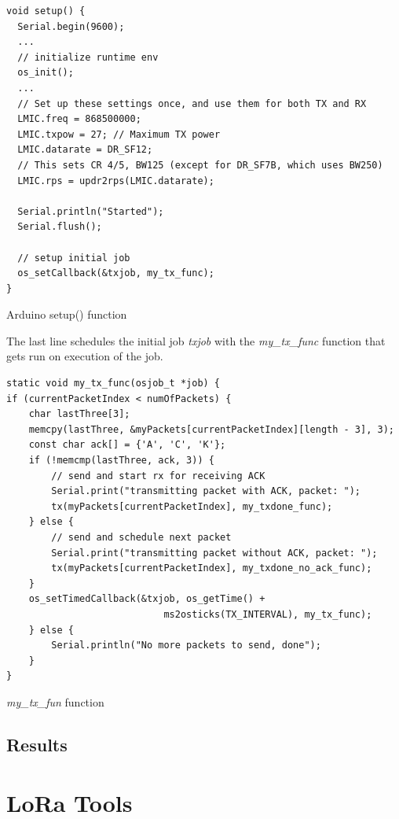 \begin{listing}[H]
    \begin{verbatim}
void setup() {
  Serial.begin(9600);
  ...
  // initialize runtime env
  os_init();
  ...
  // Set up these settings once, and use them for both TX and RX
  LMIC.freq = 868500000;
  LMIC.txpow = 27; // Maximum TX power
  LMIC.datarate = DR_SF12;
  // This sets CR 4/5, BW125 (except for DR_SF7B, which uses BW250)
  LMIC.rps = updr2rps(LMIC.datarate);

  Serial.println("Started");
  Serial.flush();

  // setup initial job
  os_setCallback(&txjob, my_tx_func);
}
    \end{verbatim}
    \caption{Arduino setup() function}
    \label{lst::ard_setup}
    
\end{listing}

The last line schedules the initial job  \emph{txjob} with the \emph{my\_tx\_func} function that gets run
on execution of the job.


\begin{listing}[H]
    \begin{verbatim}
static void my_tx_func(osjob_t *job) {
if (currentPacketIndex < numOfPackets) {
    char lastThree[3];
    memcpy(lastThree, &myPackets[currentPacketIndex][length - 3], 3);
    const char ack[] = {'A', 'C', 'K'};
    if (!memcmp(lastThree, ack, 3)) {
        // send and start rx for receiving ACK
        Serial.print("transmitting packet with ACK, packet: ");
        tx(myPackets[currentPacketIndex], my_txdone_func);
    } else {
        // send and schedule next packet
        Serial.print("transmitting packet without ACK, packet: ");
        tx(myPackets[currentPacketIndex], my_txdone_no_ack_func);
    }
    os_setTimedCallback(&txjob, os_getTime() +
                            ms2osticks(TX_INTERVAL), my_tx_func);
    } else {
        Serial.println("No more packets to send, done");
    }
}
    \end{verbatim}
    \caption{\emph{my\_tx\_fun} function}
    \label{lst::ard_mytx}
    
\end{listing}



\section{Results}

\chapter{LoRa Tools}


